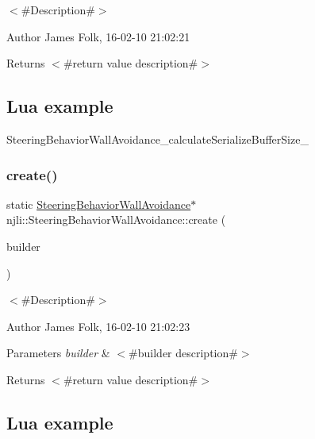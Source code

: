$<$\#\+Description\#$>$ 

\begin{DoxyAuthor}{Author}
James Folk, 16-\/02-\/10 21\+:02\+:21
\end{DoxyAuthor}
\begin{DoxyReturn}{Returns}
$<$\#return value description\#$>$
\end{DoxyReturn}
\hypertarget{classnjli_1_1_steering_behavior_wander_ex1}{}\subsection{Lua example}\label{classnjli_1_1_steering_behavior_wander_ex1}

\begin{DoxyCodeInclude}
\end{DoxyCodeInclude}
Steering\+Behavior\+Wall\+Avoidance\+\_\+calculate\+Serialize\+Buffer\+Size\+\_\+ \mbox{\label{classnjli_1_1_steering_behavior_wall_avoidance_a08f48cf4170880875c3c32e8ffd28136}} 
\subsubsection{\texorpdfstring{create()}{create()}\hspace{0.1cm}{\footnotesize\ttfamily [2/2]}}
{\footnotesize\ttfamily static \mbox{\hyperlink{classnjli_1_1_steering_behavior_wall_avoidance}{Steering\+Behavior\+Wall\+Avoidance}}$\ast$ njli\+::\+Steering\+Behavior\+Wall\+Avoidance\+::create (\begin{DoxyParamCaption}\item[{const \mbox{\hyperlink{classnjli_1_1_steering_behavior_wall_avoidance_builder}{Steering\+Behavior\+Wall\+Avoidance\+Builder}} \&}]{builder }\end{DoxyParamCaption})\hspace{0.3cm}{\ttfamily [static]}}



$<$\#\+Description\#$>$ 

\begin{DoxyAuthor}{Author}
James Folk, 16-\/02-\/10 21\+:02\+:23
\end{DoxyAuthor}

\begin{DoxyParams}{Parameters}
{\em builder} & $<$\#builder description\#$>$\\
\hline
\end{DoxyParams}
\begin{DoxyReturn}{Returns}
$<$\#return value description\#$>$
\end{DoxyReturn}
\hypertarget{classnjli_1_1_steering_behavior_wander_ex1}{}\subsection{Lua example}\label{classnjli_1_1_steering_behavior_wander_ex1}

